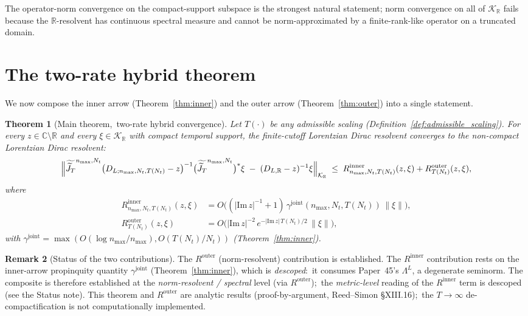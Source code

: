 \documentclass[11pt,a4paper]{article}
\theoremstyle{plain}
\newtheorem{theorem}{Theorem}[section]
\theoremstyle{definition}
\newtheorem{remark}[theorem]{Remark}
\newcommand{\nmax}{n_{\max}}
\newcommand{\Nt}{N_{t}}
\newcommand{\Krein}{\mathcal{K}}
\newcommand{\norm}[1]{\lVert #1 \rVert}
\newcommand{\R}{\mathbb{R}}
\newcommand{\C}{\mathbb{C}}
\newcommand{\DLR}{D_{L,\R}}
\newcommand{\JT}{\widetilde{J}_{T}}
\newcommand{\Lprop}{\Lambda^{L}}
\newcommand{\gammajoint}{\gamma^{\mathrm{joint}}}
\begin{document}
The operator-norm convergence on the compact-support subspace is the
strongest natural statement; norm convergence on all of $\Krein_{\R}$
fails because the $\R$-resolvent has continuous spectral measure and
cannot be norm-approximated by a finite-rank-like operator on a
truncated domain.

\section{The two-rate hybrid theorem}\label{sec:composite}

We now compose the inner arrow (Theorem~\ref{thm:inner}) and the outer
arrow (Theorem~\ref{thm:outer}) into a single statement.

\begin{theorem}[Main theorem,\ two-rate hybrid
convergence]\label{thm:main}
Let $T(\cdot)$ be any admissible scaling
(Definition~\ref{def:admissible_scaling}). For every $z \in \C
\setminus \R$ and every $\xi \in \Krein_{\R}$ with compact temporal
support, the finite-cutoff Lorentzian Dirac resolvent converges to the
non-compact Lorentzian Dirac resolvent:
\begin{equation}\label{eq:main_bound}
\Bigl\| \widetilde{\JT}^{\nmax, \Nt} \bigl(D_{L;\nmax,\Nt,T(\Nt)}
- z\bigr)^{-1}
\bigl(\widetilde{\JT}^{\nmax, \Nt}\bigr)^{*} \xi
\;-\; (\DLR - z)^{-1} \xi \Bigr\|_{\Krein_{\R}}
\;\le\; R^{\mathrm{inner}}_{\nmax, \Nt, T(\Nt)} (z, \xi) +
R^{\mathrm{outer}}_{T(\Nt)} (z, \xi),
\end{equation}
where
\begin{align}
R^{\mathrm{inner}}_{\nmax, \Nt, T(\Nt)}(z, \xi)
&= O\bigl((|\mathrm{Im}\,z|^{-1} + 1) \,
\gammajoint(\nmax, \Nt, T(\Nt)) \,\norm{\xi}\bigr),
\label{eq:main_inner}\\
R^{\mathrm{outer}}_{T(\Nt)}(z, \xi)
&= O\bigl(|\mathrm{Im}\,z|^{-2}\,e^{-|\mathrm{Im}\,z|\,T(\Nt)/2}\,
\norm{\xi}\bigr),
\label{eq:main_outer}
\end{align}
with $\gammajoint = \max(O(\log\nmax/\nmax), O(T(\Nt)/\Nt))$
(Theorem~\ref{thm:inner}).
\end{theorem}

\begin{remark}[Status of the two contributions]
The $R^{\mathrm{outer}}$ (norm-resolvent) contribution is established.
The $R^{\mathrm{inner}}$ contribution rests on the inner-arrow
propinquity quantity $\gammajoint$ (Theorem~\ref{thm:inner}), which is
\emph{descoped}:\ it consumes Paper~45's $\Lprop$, a degenerate
seminorm. The composite is therefore established at the
\emph{norm-resolvent / spectral} level (via $R^{\mathrm{outer}}$);\ the
\emph{metric-level} reading of the $R^{\mathrm{inner}}$ term is
descoped (see the Status note). This theorem and
$R^{\mathrm{outer}}$ are analytic results (proof-by-argument,
Reed--Simon \S XIII.16);\ the $T\to\infty$ de-compactification is not
computationally implemented.
\end{remark}
\end{document}
